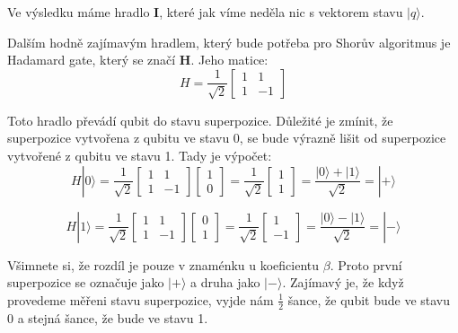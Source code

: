 \documentclass[11pt]{article}
\begin{document}
\par Ve výsledku máme hradlo \textbf{I}, které jak víme neděla nic s vektorem stavu $|q\rangle$.
\par Dalším hodně zajímavým hradlem, který bude potřeba pro Shorův algoritmus je Hadamard gate, který se značí \textbf{H}. Jeho matice:
$$H = \frac{1}{\sqrt{2}}\begin{bmatrix}
        1 & 1  \\
        1 & -1
    \end{bmatrix}$$
\par Toto hradlo převádí qubit do stavu superpozice. Důležité je zmínit, že superpozice vytvořena z qubitu ve stavu 0, se bude výrazně lišit od superpozice vytvořené z qubitu ve stavu 1.
Tady je výpočet:
$$H|0\rangle = \frac{1}{\sqrt{2}}\begin{bmatrix}
        1 & 1  \\
        1 & -1
    \end{bmatrix}\begin{bmatrix}
        1 \\
        0
    \end{bmatrix} = \frac{1}{\sqrt{2}}\begin{bmatrix}
        1 \\
        1
    \end{bmatrix} = \frac{|0\rangle + |1\rangle}{\sqrt{2}} = |+\rangle$$

$$H|1\rangle = \frac{1}{\sqrt{2}}\begin{bmatrix}
        1 & 1  \\
        1 & -1
    \end{bmatrix}\begin{bmatrix}
        0 \\
        1
    \end{bmatrix} = \frac{1}{\sqrt{2}}\begin{bmatrix}
        1 \\
        -1
    \end{bmatrix} = \frac{|0\rangle - |1\rangle}{\sqrt{2}} = |-\rangle$$

\par Všimnete si, že rozdíl je pouze v znaménku u koeficientu $\beta$. Proto první superpozice se označuje jako $|+\rangle$ a druha jako $|-\rangle$.
Zajímavý je, že když provedeme měřeni stavu superpozice, vyjde nám $\frac{1}{2}$ šance, že qubit bude ve stavu 0 a stejná šance, že bude ve stavu 1.
\end{document}
